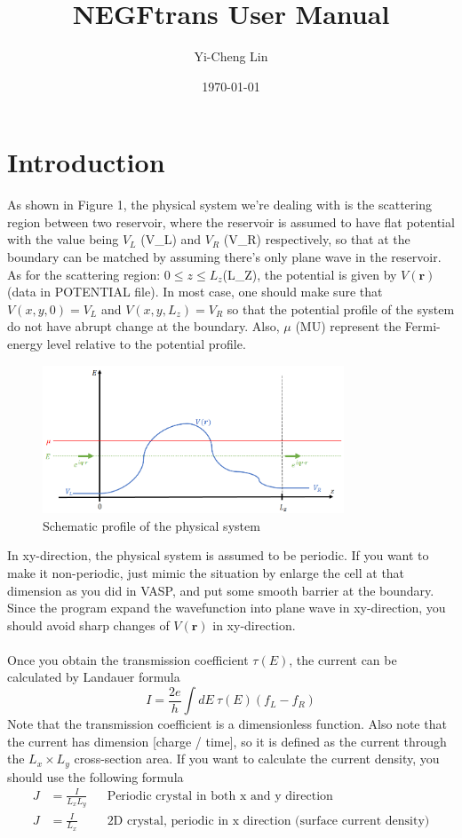 \documentclass[10pt]{article}
\title{NEGFtrans User Manual}
\author{Yi-Cheng Lin}
\date{\today}
\begin{document}
\maketitle

\tableofcontents

\section{Introduction}
As shown in Figure 1, the physical system we're dealing with is the scattering region between two reservoir, where the reservoir is assumed to have flat potential with the value being $V_L$ (V{\_}L) and $V_R$ (V{\_}R) respectively, so that at the boundary can be matched by assuming there's only plane wave in the reservoir. As for the scattering region: $0 \le z \le L_z$(L{\_}Z), the potential is given by $V(\bm{r})$(data in POTENTIAL file). In most case, one should make sure that $V(x, y, 0) = V_L$ and $V(x, y, L_z) = V_R$ so that the potential profile of the system do not have abrupt change at the boundary. Also, $\mu$ (MU) represent the Fermi-energy level relative to the potential profile.

\begin{figure}[h!]
\centering
\includegraphics[width=0.8\textwidth]{profile}
\caption{Schematic profile of the physical system}
\end{figure}

\noindent
In xy-direction, the physical system is assumed to be periodic. If you want to make it non-periodic, just mimic the situation by enlarge the cell at that dimension as you did in VASP, and put some smooth barrier at the boundary. Since the program expand the wavefunction into plane wave in xy-direction, you should avoid sharp changes of $V(\bm{r})$ in xy-direction.\\\\
Once you obtain the transmission coefficient $\tau(E)$, the current can be calculated by Landauer formula
\[I = \frac{2e}{h}\int dE\ \tau(E) (f_L - f_R)\]
Note that the transmission coefficient is a dimensionless function. Also note that the current has dimension [charge / time], so it is defined as the current through the $L_x \times L_y$ cross-section area. If you want to calculate the current density, you should use the following formula
\begin{align*}
J &= \frac{I}{L_x L_y} && \text{Periodic crystal in both x and y direction} \\
J &= \frac{I}{L_x} && \text{2D crystal, periodic in x direction (surface current density)} 
\end{align*}
\end{document}
